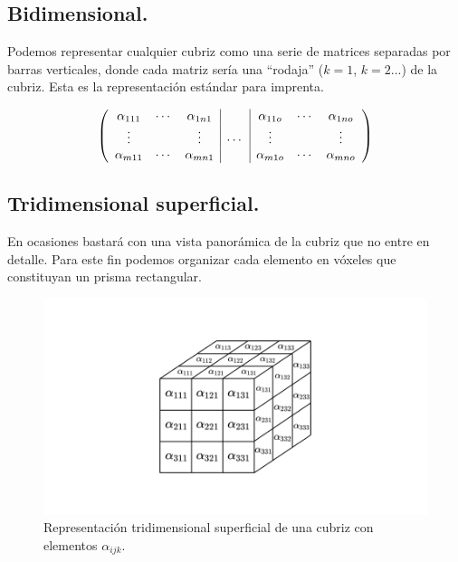 \documentclass[a4paper, titlepage]{article}
\begin{document}
\subsection{Bidimensional.}

Podemos representar cualquier cubriz como una serie de matrices separadas por barras verticales, donde cada matriz sería una ``rodaja'' ($k=1$, $k=2$...) de la cubriz. Esta es la representación estándar para imprenta.

\[ \left(
\begin{array}{c c c | c | c c c}
	\alpha_{111} & \cdots & \alpha_{1n1} &        & \alpha_{11o} & \cdots & \alpha_{1no} \\
	\vdots       &        & \vdots       & \cdots & \vdots       &        & \vdots       \\
	\alpha_{m11} & \cdots & \alpha_{mn1} &        & \alpha_{m1o} & \cdots & \alpha_{mno} \\
\end{array} \right)
\]

\subsection{Tridimensional superficial.}

En ocasiones bastará con una vista panorámica de la cubriz que no entre en detalle. Para este fin podemos organizar cada elemento en vóxeles que constituyan un prisma rectangular.

\begin{figure}[H]
	\includegraphics[width=\linewidth]{media/tridimensional_sup.png}
	\caption{Representación tridimensional superficial de una cubriz con elementos $\alpha_{ijk}$.}
\end{figure}

\newpage
\end{document}
